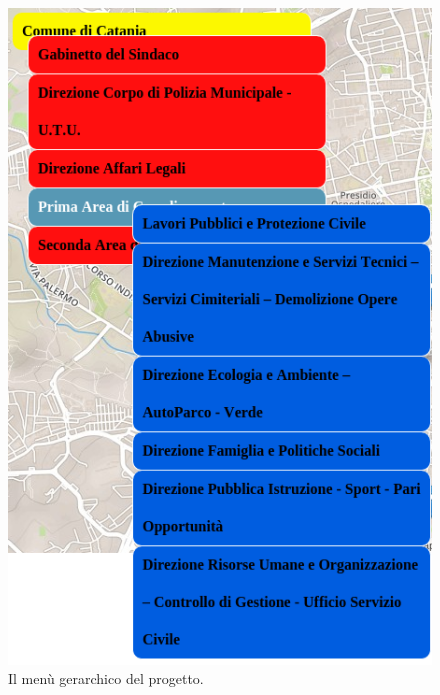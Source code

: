 \documentclass[a4paper,11pt]{article}
\begin{document}
\begin{figure}[htpb]
	\centering
	\includegraphics[scale=0.4]{menu.png}
	\caption{Il menù gerarchico del progetto.}
	\label{fig:9}
\end{figure}
\end{document}

